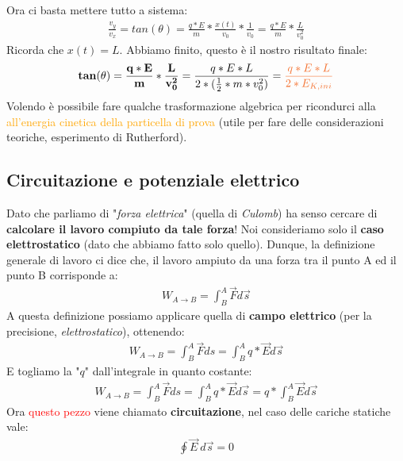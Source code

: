             Ora ci basta mettere tutto a sistema:
            \begin{align*}
                \frac{v_y}{v_x} = tan(\theta) = \frac{q*E}{m}*\frac{x(t)}{v_0} *\frac{1}{v_0} = \frac{q*E}{m} * \frac{L}{v_0^2}
            \end{align*}
            Ricorda che $x(t) = L$. Abbiamo finito, questo è il nostro risultato finale:
            \begin{align*}
                \mathbf{tan(\theta) = \frac{q*E}{m} * \frac{L}{v_0^2}} = \frac{q*E*L}{2*(\frac{1}{2}*m*v_0^2)} = \textcolor{Orange}{\frac{q*E*L}{2*E_{K, ini}}}
            \end{align*}
            Volendo è possibile fare qualche trasformazione algebrica per ricondurci alla \textcolor{Orange}{all'energia cinetica della particella di prova} (utile per fare delle considerazioni teoriche, esperimento di Rutherford).

    \subsection{Circuitazione e potenziale elettrico}
        Dato che parliamo di "\textit{forza elettrica}" (quella di \textit{Culomb}) ha senso cercare di \textbf{calcolare il lavoro compiuto da tale forza}! Noi consideriamo solo il \textbf{caso elettrostatico} (dato che abbiamo fatto solo quello). Dunque, la definizione generale di lavoro ci dice che, il lavoro ampiuto da una forza tra il punto A ed il punto B corrisponde a:
        \begin{align*}
            W_{A\rightarrow B}=\int^A_B\vec{F}d\vec{s}
        \end{align*}
        A questa definizione possiamo applicare quella di \textbf{campo elettrico} (per la precisione, \textit{elettrostatico}), ottenendo:
        \begin{align*}
            W_{A\rightarrow B}=\int^A_B\vec{F}ds=\int^A_Bq*\vec{E}d\vec{s}
        \end{align*}
        E togliamo la "$q$" dall'integrale in quanto costante:
        \begin{align*}
            W_{A\rightarrow B}=\int^A_B\vec{F}ds=\int^A_Bq*\vec{E}d\vec{s}=q*\int^A_B\vec{E}d\vec{s}
        \end{align*}
        Ora \textcolor{Red}{questo pezzo} viene chiamato \textbf{circuitazione}, nel caso delle cariche statiche vale:
        \begin{align*}
            \oint\vec{E}\ d\vec{s} = 0
        \end{align*}
